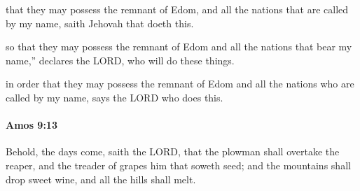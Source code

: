 			\begin{versebox}
					\item[BHS] 
					\item[LXX] 
					\item[ASV] that they may possess the remnant of Edom, and all the nations that are called by my name, saith Jehovah that doeth this.
					\item[NIV] so that they may possess the remnant of Edom and all the nations that bear my name,” declares the LORD, who will do these things.
					\item[NRSV] in order that they may possess the remnant of Edom and all the nations who are called by my name, says the LORD who does this.
			\end{versebox}

		\paragraph{Amos 9:13} %
			\label{AMOS-9-13}

			Behold, the days come, saith the LORD, that the plowman shall overtake the reaper, and the treader of grapes him that soweth seed; and the mountains shall drop sweet wine, and all the hills shall melt.

